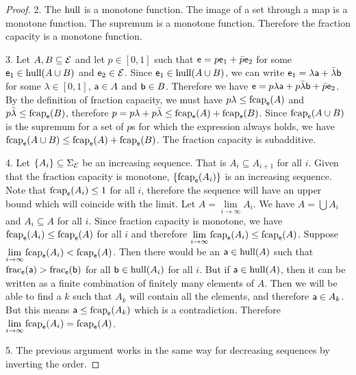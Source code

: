 \begin{mathSection}
\begin{proof}
		2. The $\hull$ is a monotone function. The image of a set through a map is a monotone function. The supremum is a monotone function. Therefore the fraction capacity is a monotone function.
		
		3. Let $A, B \subseteq \Ens$ and let $p \in [0,1]$ such that $\ens = p \ens_1 + \bar{p} \ens_2$ for some $\ens_1 \in \hull(A \cup B)$ and $\ens_2 \in \Ens$. Since $\ens_1 \in \hull(A \cup B)$, we can write $\ens_1 = \lambda \ens[a] + \bar{\lambda} \ens[b]$ for some $\lambda \in [0,1]$, $\ens[a] \in A$ and $\ens[b] \in B$. Therefore we have $\ens = p \lambda \ens[a] + p \bar{\lambda} \ens[b] + \bar{p} \ens_2$. By the definition of fraction capacity, we must have $p\lambda \leq \fcap_{\ens}(A)$ and $p\bar{\lambda} \leq \fcap_{\ens}(B)$, therefore $p = p\lambda + p\bar{\lambda} \leq \fcap_{\ens}(A) + \fcap_{\ens}(B)$. 	Since $\fcap_{\ens}(A \cup B)$ is the supremum for a set of $p$s for which the expression always holds, we have $\fcap_{\ens}(A \cup B) \leq \fcap_{\ens}(A) + \fcap_{\ens}(B)$. The fraction capacity is subadditive.
		
		4. Let $\{A_i\} \subseteq \Sigma_{\Ens}$ be an increasing sequence. That is $A_i \subseteq A_{i+1}$ for all $i$. Given that the fraction capacity is monotone, $\{\fcap_{\ens}(A_i)\}$ is an increasing sequence. Note that $\fcap_{\ens}(A_i) \leq 1$ for all $i$, therefore the sequence will have an upper bound which will coincide with the limit. Let $A = \lim\limits_{i \to \infty} A_i$. We have $A = \bigcup A_i$ and $A_i \subseteq A$ for all $i$. Since fraction capacity is monotone, we have $\fcap_{\ens}(A_i) \leq \fcap_{\ens}(A)$ for all $i$ and therefore $\lim\limits_{i \to \infty} \fcap_{\ens}(A_i) \leq \fcap_{\ens}(A)$. Suppose $\lim\limits_{i \to \infty} \fcap_{\ens}(A_i) < \fcap_{\ens}(A)$. Then there would be an $\ens[a] \in \hull(A)$ such that $\fraction_{\ens}(\ens[a]) > \fraction_{\ens}(\ens[b])$ for all $\ens[b] \in \hull(A_i)$ for all $i$. But if $\ens[a] \in \hull(A)$, then it can be written as a finite combination of finitely many elements of $A$. Then we will be able to find a $k$ such that $A_k$ will contain all the elements, and therefore $\ens[a] \in A_k$. But this means $\ens[a] \leq \fcap_{\ens}(A_k)$ which is a contradiction. Therefore $\lim\limits_{i \to \infty} \fcap_{\ens}(A_i) = \fcap_{\ens}(A)$.
		
		5. The previous argument works in the same way for decreasing sequences by inverting the order.
	\end{proof}
\end{mathSection}

